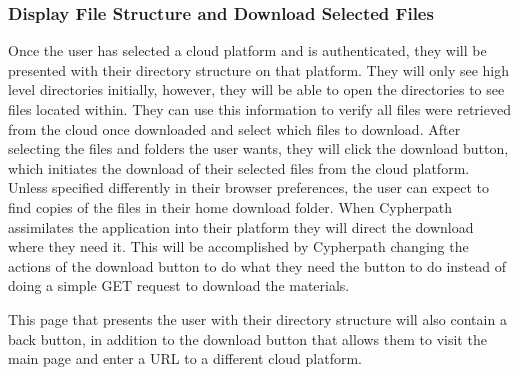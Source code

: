 \documentclass{article}
\begin{document}
            \subsubsection{Display File Structure and Download Selected Files}
            Once the user has selected a cloud platform and is authenticated, they will be presented with their directory structure on that platform. They will only see high level directories initially,
            however, they will be able to open the directories to see files located within. They can use this information to verify all files were retrieved from the cloud once downloaded and select which
            files to download. After selecting the files and folders the user wants, they will click the download button, which initiates the download of their selected files from the cloud platform.
            Unless specified differently in their browser preferences, the user can expect to find copies of the files in their home download folder.
            When Cypherpath assimilates the application into their platform they will direct the download where they need it. This will be accomplished by Cypherpath changing the actions of the download button to
            do what they need the button to do instead of doing a simple GET request to download the materials.

            This page that presents the user with their directory structure will also contain a back button, in addition to the download button that allows them to visit the main page and enter a URL to a different
            cloud platform.

\end{document}
